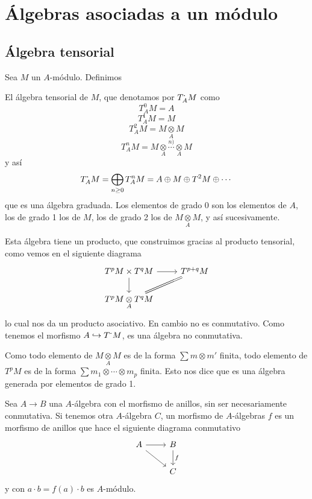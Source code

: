 \chapter{\'Algebras asociadas a un m\'odulo}
\justifying 
\section{\'Algebra tensorial}
Sea $M$ un $A$-m\'odulo. Definimos
\begin{defi}
    El \'algebra tensorial de $M$, que denotamos por $T^{\boldsymbol{\cdot}}_AM$ como
    $$T^0_AM = A $$
    $$T^1_AM = M $$
    $$T^2_AM = M \underset{A}{\otimes} M $$
    $$T^n_AM =  M \underset{A}{\otimes} \overset{n)}{\cdots} \underset{A}{\otimes} M $$
    y as\'i
    $$T^{\boldsymbol{\cdot}}_AM = \bigoplus_{n \geq 0} T^n_AM =A \oplus M \oplus T^2M\oplus \cdots $$
    que es una \'algebra graduada. Los elementos de grado 0 son los elementos de $A$, los de grado 1 los de $M$, los de grado 2 los de $M \underset{A}{\otimes} M$, y as\'i sucesivamente.
\end{defi}
\begin{propis} Esta \'algebra tiene un producto, que construimos gracias al producto tensorial, como vemos en el siguiente diagrama $$\bt T^pM \times T^qM \arrow{d} \arrow{r} & T^{p+q}M \\ T^pM \underset{A}{\otimes} T^q M \arrow[equal]{ru}\et$$
        lo cual nos da un producto asociativo. En cambio no es conmutativo. Como tenemos el morfismo $A \hookrightarrow T^{\boldsymbol{\cdot}}M$, es una \'algebra no conmutativa. 

        Como todo elemento de $M\underset{A}{\otimes} M$ es de la forma $\sum m \otimes m'$ finita, todo elemento de $T^pM$ es de la forma $\sum m_1\otimes \cdots \otimes m_p$ finita. Esto nos dice que es una \'algebra generada por elementos de grado 1. 
\end{propis}

Sea $A \longrightarrow B$ una $A$-\'algebra con el morfismo de anillos, sin ser necesariamente conmutativa. Si tenemos otra $A$-\'algebra $C$, un morfismo de $A$-\'algebras $f$ es un morfismo de anillos que hace el siguiente diagrama conmutativo $$\bt A \arrow{r} \arrow{rd} & B \arrow{d}{f} \\ & C \et$$ y  con $a\cdot b = f(a)\cdot b$ es $A$-m\'odulo.

